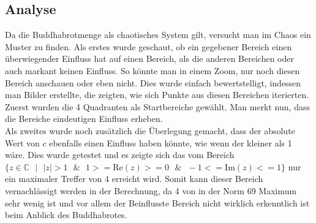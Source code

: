 \subsection{Analyse}
Da die Buddhabrotmenge als chaotisches System gilt, versucht man im Chaos ein Muster zu finden. Als erstes wurde geschaut, ob ein gegebener Bereich einen überwiegender Einfluss hat auf einen Bereich, als die anderen Bereichen oder auch markant keinen Einfluss. So könnte man in einem Zoom, nur noch diesen Bereich anschauen oder eben nicht. Dies wurde einfach bewertstelligt, indessen man Bilder erstellte, die zeigten, wie sich Punkte aus diesen Bereichen iterierten. Zuerst wurden die 4 Quadranten als Startbereiche gewählt. Man merkt nun, dass die Bereiche eindeutigen Einfluss erheben.
\\
Als zweites wurde noch zusätzlich die Überlegung gemacht, dass der absolute Wert von $c$ ebenfalls einen Einfluss haben könnte, wie wenn der kleiner als 1 wäre. Dies wurde getestet und es zeigte sich das vom Bereich $\{z \in \mathbb{C}\text{ }|\text{ } |z| >1\text{ } \& \text{ } 1>=\text{Re}(z)>=0 \text{ } \& \text{ }-1<=\text{Im}(z)<=1\}$ nur ein maximaler Treffer von 4 erreicht wird. Somit kann dieser Bereich vernachlässigt werden in der Berechnung, da 4 von in der Norm 69 Maximum sehr wenig ist und vor allem der Beinflusste Bereich nicht wirklich erkenntlich ist beim Anblick des Buddhabrotes.